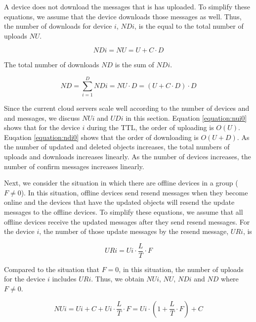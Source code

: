 \documentclass[a4paper,11pt]{report}
\begin{document}
A device does not download the messages that is has uploaded.
To simplify these equations, we assume that the device downloads those messages as well.
Thus, the number of downloads for device $i$, $NDi$, is the equal to the total number of uploads $NU$.

\begin{equation}
NDi = NU = U + C \cdot D
\label{equation:ndi0}
\end{equation}

The total number of downloads $ND$ is the sum of $NDi$.

\begin{equation}
ND = \sum_{i = 1}^{D} NDi = NU \cdot D =  (U + C \cdot D) \cdot D
\label{equation:nd0}
\end{equation}

Since the current cloud servers scale well according to the number of devices and and messages, we discuss $NUi$ and $UDi$ in this section.
Equation \ref{equation:nui0} shows that for the device $i$ during the TTL, the order of uploading is $O(U)$.
Euqation \ref{equation:ndi0} shows that the order of downloading is $O(U+D)$.
As the number of updated and deleted objects increases, the total numbers of uploads and downloads increases linearly.
As the number of devices increases, the number of confirm messages increases linearly.

Next, we consider the situation in which there are offline devices in a group ($F \neq 0$).
In this situation, offline devices send resend messages when they become online and the devices that have the updated objects will resend the update messages to the offline devices.
To simplify these equations, we assume that all offline devices receive the updated messages after they send resend messages.
For the device $i$, the number of those update messages by the resend message, $URi$, is

\begin{equation}
URi = Ui \cdot \frac{L}{T} \cdot F
\label{equation:uri}
\end{equation}

Compared to the situation that $F=0$, in this situation, the number of uploads for the device $i$ includes $URi$.
Thus, we obtain $NUi$, $NU$, $NDi$ and $ND$ where $F \neq 0$.

\begin{equation}
NUi = Ui + C + Ui \cdot \frac{L}{T} \cdot F = Ui \cdot (1 + \frac{L}{T} \cdot F) + C
\label{equation:nui}
\end{equation}
\end{document}
